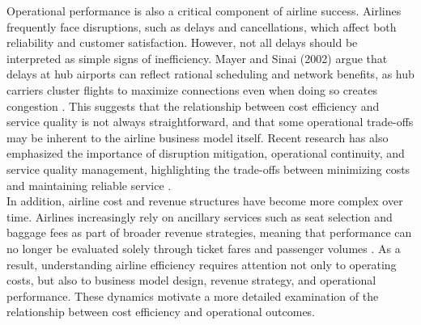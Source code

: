 \documentclass[11pt, letterpaper]{article}
\begin{document}
\indent Operational performance is also a critical component of airline success. Airlines frequently face disruptions, such as delays and cancellations, which affect both reliability and customer satisfaction. However, not all delays should be interpreted as simple signs of inefficiency. Mayer and Sinai (2002) argue that delays at hub airports can reflect rational scheduling and network benefits, as hub carriers cluster flights to maximize connections even when doing so creates congestion \cite{MayerSinai2002}. This suggests that the relationship between cost efficiency and service quality is not always straightforward, and that some operational trade-offs may be inherent to the airline business model itself. Recent research has also emphasized the importance of disruption mitigation, operational continuity, and service quality management, highlighting the trade-offs between minimizing costs and maintaining reliable service \cite{Anupkumar2023,Lee2023,Yalvac2026}.\\
\indent In addition, airline cost and revenue structures have become more complex over time. Airlines increasingly rely on ancillary services such as seat selection and baggage fees as part of broader revenue strategies, meaning that performance can no longer be evaluated solely through ticket fares and passenger volumes \cite{Zhou2020}. As a result, understanding airline efficiency requires attention not only to operating costs, but also to business model design, revenue strategy, and operational performance. These dynamics motivate a more detailed examination of the relationship between cost efficiency and operational outcomes.
\end{document}
